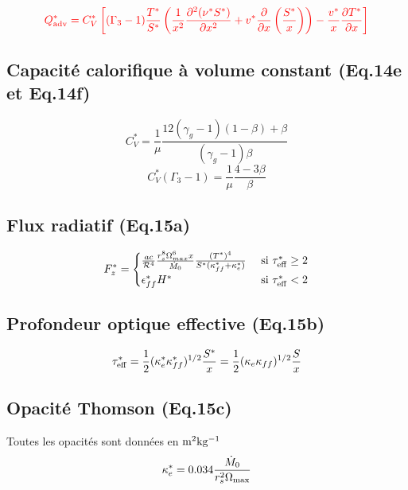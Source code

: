 \documentclass[a4paper,11pt]{article}
\begin{document}
    \begin{equation}\label{advection_valentin}
      {\color{red}
      Q_{\rm{adv}}^* = C_V^* \left[ (\Gamma_3 -1) \frac{T^*}{S^*} \left( \frac{1}{x^2} \frac{\partial^2(\nu^* S^*)}{\partial x^2} + v^*\frac{\partial}{\partial x} \left(\frac{S^*}{x}\right) \right) - \frac{v^*}{x} \frac{\partial T^*}{\partial x} \right]
      }
    \end{equation}
      
    
\subsection{Capacité calorifique à volume constant (Eq.14e et Eq.14f)}
    \begin{equation}\label{capacite_calorifique1}
        C_V^* = \frac{1}{\mu} \frac{12(\gamma_g -1)(1 - \beta) + \beta}{(\gamma_g -1)\beta}
    \end{equation}
    \begin{equation}\label{capacite_calorifique2}
        C_V^* (\Gamma_3 -1) = \frac{1}{\mu} \frac{4 - 3 \beta}{\beta}
    \end{equation}
    
\subsection{Flux radiatif (Eq.15a)}
    \begin{equation}\label{flux_radiatif}
        F_z^*=
        \begin{cases}
            \frac{a c}{\mathcal{R}^4} \frac{r_s^8\Omega_{max}^6 x}{\dot{M}_0}\frac{(T^*)^4}{S^*(\kappa_{ff}^*+\kappa_e^*)} & \text{ si } \tau_{\rm{eff}}^* \geq 2 \\
            \epsilon_{ff}^* H^* & \text{ si } \tau_{\rm{eff}}^* < 2
        \end{cases}
    \end{equation}

\subsection{Profondeur optique effective (Eq.15b)}
    \begin{equation}\label{profondeur_optique}
        \tau_{\rm{eff}}^* =\frac{1}{2} (\kappa_{e}^* \kappa_{ff}^* ) ^{1/2} \frac{S^*}{x}=\frac{1}{2} (\kappa_{e} \kappa_{ff} ) ^{1/2} \frac{S}{x}
    \end{equation}

\subsection{Opacité Thomson (Eq.15c)}
Toutes les opacités sont données en $\rm{m^2 kg^{-1}}$
    \begin{equation}\label{opacite_thomson}
        \kappa_{e}^* =  0.034 \frac{\dot{M}_0}{r_s^2 \Omega_{\rm{max}}} 
    \end{equation}
\end{document}
